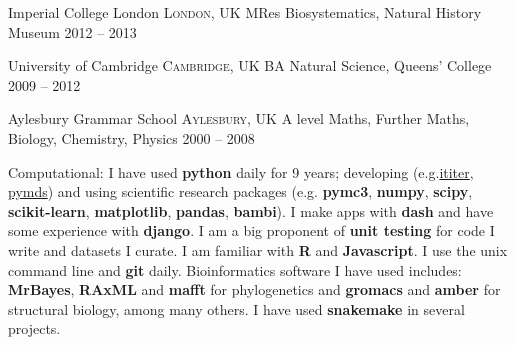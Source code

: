 \documentclass[10pt,a4paper]{article}
\begin{document}
\headedsection
{Imperial College London}
{\textsc{London, UK}} {%
  \headedsubsection
  {MRes Biosystematics, Natural History Museum}
  {2012 -- 2013}
  {
  }
}

\headedsection
{University of Cambridge}
{\textsc{Cambridge, UK}} {%
  \headedsubsection
  {BA Natural Science, Queens' College}
  {2009 -- 2012}
  {
  }
}

\headedsection
{Aylesbury Grammar School}
{\textsc{Aylesbury, UK}} {
  \headedsubsection
  {A level Maths, Further Maths, Biology, Chemistry, Physics}
  {2000 -- 2008}
  {}
}

\spacedhrule{0.5em}{-0.4em}


\inlineheadsection  %
{Computational:} {I have used \textbf{python} daily for 9 years; developing
  (e.g.\@ \href{https://ititer.readthedocs.io/}{ititer},
  \href{https://pymds.readthedocs.io}{pymds}) and using scientific research
  packages (e.g. \textbf{pymc3}, \textbf{numpy}, \textbf{scipy},
  \textbf{scikit-learn}, \textbf{matplotlib}, \textbf{pandas}, \textbf{bambi}).
  I make apps with \textbf{dash} and have some experience with \textbf{django}.
  \sbull I am a big proponent of \textbf{unit testing} for code I write and
  datasets I curate. \sbull I am familiar with \textbf{R} and
  \textbf{Javascript}. \sbull I use the unix command line and \textbf{git}
  daily. \sbull Bioinformatics software I have used includes: \textbf{MrBayes},
  \textbf{RAxML} and \textbf{mafft} for phylogenetics and \textbf{gromacs} and
  \textbf{amber} for structural biology, among many others. \sbull I have used
  \textbf{snakemake} in several projects.}
\end{document}
